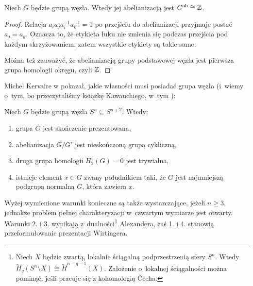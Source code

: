 \begin{corollary}
    Niech $G$ będzie grupą węzła.
    Wtedy jej abelianizacją jest $G^{\operatorname{ab}} \cong \mathbb Z$.
\end{corollary}

\begin{proof}
    Relacja $a_ia_ja_i^{-1}a_k^{-1}=1$ po przejściu do abelianizacji przyjmuje postać $a_j = a_k$.
    Oznacza to, że etykieta łuku nie zmienia się podczas przejścia pod każdym skrzyżowaniem, zatem wszystkie etykiety są takie same.

    Można też zauważyć, że abelianizacją grupy podstawowej węzła jest pierwsza grupa homologii okręgu, czyli $\mathbb Z$.
\end{proof}

Michel Kervaire w \cite{kervaire65} pokazał, jakie własności musi posiadać grupa węzła (i~wiemy o~tym, bo przeczytaliśmy książkę Kawauchiego, w~tym \cite[tw. 14.1.1]{kawauchi96}):
%

\begin{proposition}
%
%
    Niech $G$ będzie grupą węzła $S^n \subseteq S^{n+2}$.
    Wtedy:
    \begin{enumerate}
        \item grupa $G$ jest skończenie prezentowana,
        \item abelianizacja $G/G'$ jest nieskończoną grupą cykliczną,
        \item druga grupa homologii $H_2(G) = 0$ jest trywialna,
        \item istnieje element $x \in G$ zwany południkiem taki, że $G$ jest najmniejszą podgrupą normalną $G$, która zawiera $x$.
    \end{enumerate}
\end{proposition}

Wyżej wymienione warunki konieczne są także wystarczające, jeżeli $n \ge 3$, jednakże problem pełnej charakteryzacji w~czwartym wymiarze jest otwarty.
Warunki 2. i 3. wynikają z~dualności\footnote{Niech $X$ będzie zwartą, lokalnie ściągalną podprzestrzenią sfery $S^n$. Wtedy $\tilde {H}_{q}(S^n \setminus X) \cong \tilde H^{n-q-1}(X)$. Założenie o~lokalnej ściągalności można pominąć, jeśli pracuje się z kohomologią Čecha.} Alexandera, zaś 1. i 4. stanowią przeformułowanie prezentacji Wirtingera.




